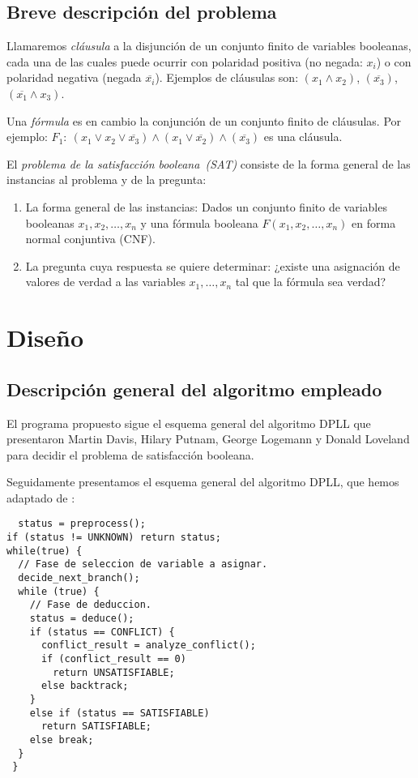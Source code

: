 \documentclass[12pt,lettersize,oneside]{article}
\begin{document}
\subsection{Breve descripción del problema} 
Llamaremos \emph{cláusula} a la disjunción de un conjunto finito de variables
booleanas, cada una de las cuales puede ocurrir con polaridad positiva (no
negada: $x_i$) o con polaridad negativa (negada $\overline{x_i}$).  
Ejemplos de cláusulas son: $(x_1 \wedge x_2)$, $(\overline{x_3})$,
$(\overline{x_1} \wedge x_3)$.

Una \emph{fórmula} es en cambio la conjunción de un conjunto finito de
cláusulas. Por ejemplo: $F_1:\ (x_1 \vee x_2 \vee \overline{x_3}) \wedge (x_1
\vee \overline{x_2}) \wedge (\overline{x_3})$ es una cláusula.

El \emph{problema de la satisfacción booleana~(SAT)} consiste de la
forma general de las instancias al problema y de la pregunta: \vspace{-2.5mm}
\begin{enumerate}
\item La forma general de las instancias: Dados un conjunto finito de variables
  booleanas $x_1,x_2,\ldots,x_n$ y una fórmula booleana $F(x_1,x_2,\ldots,x_n)$
  en forma normal conjuntiva (CNF).
\item La pregunta cuya respuesta se quiere determinar: ¿existe una asignación de
  valores de verdad a las variables $x_1,\ldots, x_n$ tal que la fórmula sea
  verdad?
\end{enumerate}

\section{Diseño}

\subsection{Descripción general del algoritmo empleado}
El programa propuesto sigue el esquema general del algoritmo DPLL que presentaron
Martin Davis, Hilary Putnam, George Logemann y Donald Loveland para decidir el
problema de satisfacción booleana.

Seguidamente presentamos el esquema general del algoritmo DPLL, que hemos
adaptado de \cite{Zhang}:

\begin{lstlisting}
  status = preprocess(); 
if (status != UNKNOWN) return status; 
while(true) { 
  // Fase de seleccion de variable a asignar.
  decide_next_branch(); 
  while (true) { 
    // Fase de deduccion.
    status = deduce(); 
    if (status == CONFLICT) { 
      conflict_result = analyze_conflict(); 
      if (conflict_result == 0) 
        return UNSATISFIABLE; 
      else backtrack; 
    } 
    else if (status == SATISFIABLE) 
      return SATISFIABLE; 
    else break; 
  } 
 } 
\end{lstlisting}
\vspace{-2.5mm}
\end{document}

